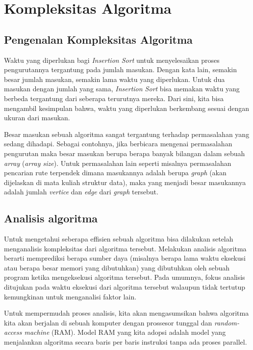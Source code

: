 \chapter{Kompleksitas Algoritma}\label{ch:modul6}


\section{Pengenalan Kompleksitas Algoritma}
Waktu yang diperlukan bagi \textit{Insertion Sort} untuk menyelesaikan proses pengurutannya tergantung pada jumlah masukan. Dengan kata lain, semakin besar jumlah masukan, semakin lama waktu yang diperlukan. Untuk dua masukan dengan jumlah yang sama, \textit{Insertion Sort} bisa memakan waktu yang berbeda tergantung dari seberapa terurutnya mereka. Dari sini, kita bisa mengambil kesimpulan bahwa, waktu yang diperlukan berkembang sesuai dengan ukuran dari masukan.

Besar masukan sebuah algoritma sangat tergantung terhadap permasalahan yang sedang dihadapi. Sebagai contohnya, jika berbicara mengenai permasalahan pengurutan maka besar masukan berupa berapa banyak bilangan dalam sebuah \textit{array} (\textit{array size}). Untuk permasalahan lain seperti misalnya permasalahan pencarian rute terpendek dimana masukannya adalah berupa \textit{graph} (akan dijelaskan di mata kuliah struktur data), maka yang menjadi besar masukannya adalah jumlah \textit{vertice} dan \textit{edge} dari \textit{graph} tersebut. 

\section{Analisis algoritma}
Untuk mengetahui seberapa effisien sebuah algoritma bisa dilakukan setelah menganalisis kompleksitas dari algoritma tersebut. Melakukan analisis algoritma berarti memprediksi berapa sumber daya (misalnya berapa lama waktu eksekusi atau berapa besar memori yang dibutuhkan) yang dibutuhkan oleh sebuah program ketika mengeksekusi algoritma tersebut. Pada umumnya, fokus analisis ditujukan pada waktu eksekusi dari algoritma tersebut walaupun tidak tertutup kemungkinan untuk menganalisi faktor lain.

Untuk mempermudah proses analisis, kita akan mengasumsikan bahwa algoritma kita akan berjalan di sebuah komputer dengan prossesor tunggal dan \textit{random-access machine} (RAM). Model RAM yang kita adopsi adalah model yang menjalankan algoritma secara baris per baris instruksi tanpa ada proses parallel. 

